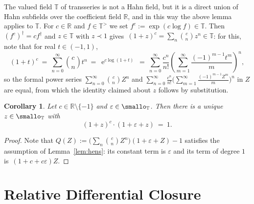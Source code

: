 \documentclass[]{amsart}
\numberwithin{equation}{section}
\newcommand{\bbold}{\mathbb}
\def\R { {\bbold R} }
\def\T { {\bbold T} }
\def \ex{\operatorname{e}}
\newtheorem{cor}[theorem]{Corollary}
\theoremstyle{definition}
\theoremstyle{remark}
\begin{document}
\noindent
The valued field $\T$ of transseries is not a Hahn field, but it is a
direct union of Hahn subfields over the coefficient field $\R$, and in
this way the above lemma applies to $\T$.
For $c\in\R$ and $f\in\T^>$ we set $f^c:=\exp(c\log f)\in \T$. Then~$(f^c)^\dagger=cf^\dagger$ and
$z\in\T$ with $z\prec 1$ gives~$(1+z)^c=\sum_n {c\choose n}z^n\in\T$: for this, note that
for real $t\in (-1,1)$,
$$(1+t)^c\ =\ \sum_{n=0}^\infty {c\choose n}t^n\ =\ \ex^{c\log(1+t)}\ =\ 
\sum_{n=0}^\infty \frac{c^n}{n!}\left(\sum_{m=1}^\infty \frac{(-1)^{m-1}t^m}{m}\right)^n,$$
so the formal power series $\sum_{n=0}^\infty {c\choose n}Z^n$ and $\sum_{n=0}^\infty \frac{c^n}{n!}\big(\sum_{m=1}^\infty \frac{(-1)^{m-1}Z^m}{m}\big)^n$ in $Z$ are equal, from which the identity claimed about $z$ follows by substitution. 



\begin{cor}\label{cor:hens, 2}
Let $c\in\R\setminus\{-1\}$ and $\varepsilon\in\smallo_{\T}$. Then there is a unique $z\in\smallo_{\T}$ with
$$(1+z)^c \cdot ( 1+\varepsilon +z)\ =\ 1.$$
\end{cor}
\begin{proof} Note that  $Q(Z):= \big(\sum_n{c\choose n}Z^n\big)(1+\varepsilon+Z)-1$ satisfies the
assumption of Lem\-ma~\ref{lem:hens}: its constant term is $\varepsilon$ and its term of degree $1$  is~$(1+c+c\varepsilon)Z$.
\end{proof}
 
 
 
\section{Relative Differential Closure}\label{sec:diff closure}
\end{document}
